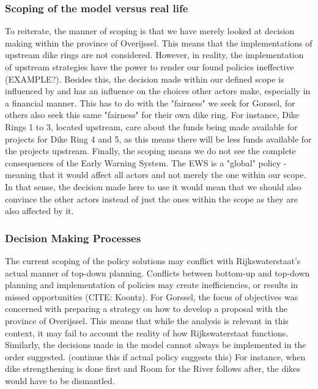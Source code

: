 \subsubsection{Scoping of the model versus real life}
To reiterate, the manner of scoping is that we have merely looked at decision making within the province of Overijssel. This means that the implementations of upstream dike rings are not considered. However, in reality, the implementation of upstream strategies have the power to render our found policies ineffective (EXAMPLE?). Besides this, the decision made within our defined scope is influenced by and has an influence on the choices other actors make, especially in a financial manner. This has to do with the "fairness" we seek for Gorssel, for others also seek this same "fairness" for their own dike ring. For instance, Dike Rings 1 to 3, located upstream, care about the funds being made available for projects for Dike Ring 4 and 5, as this means there will be less funds available for the projects upstream. Finally, the scoping means we do not see the complete consequences of the Early Warning System. The EWS is a "global" policy - meaning that it would affect all actors and not merely the one within our scope. In that sense, the decision made here to use it would mean that we should also convince the other actors instead of just the ones within the scope as they are also affected by it. 


\subsubsection{Decision Making Processes}
The current scoping of the policy solutions may conflict with Rijkswaterstaat's actual manner of top-down planning. Conflicts between bottom-up and top-down planning and implementation of policies may create inefficiencies, or results in missed opportunities (CITE: Koontz). For Gorssel, the focus of objectives was concerned with preparing a strategy on how to develop a proposal with the province of Overijssel. This means that while the analysis is relevant in this context, it may fail to account the reality of how Rijkswaterstaat functions. Similarly, the decisions made in the model cannot always be implemented in the order suggested. (continue this if actual policy suggests this) For instance, when dike strengthening is done first and Room for the River follows after, the dikes would have to be dismantled. 

